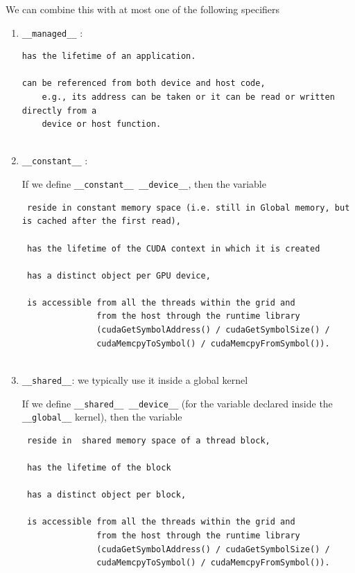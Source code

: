 We can combine this with at most one of the following specifiers
\begin{enumerate}
  
  \item \verb!__managed__! :
  
\begin{verbatim}
has the lifetime of an application.

can be referenced from both device and host code, 
    e.g., its address can be taken or it can be read or written directly from a
    device or host function.
    
\end{verbatim}
  
  \item \verb!__constant__! : 
  
  If we define \verb!__constant__ __device__!, then the variable
  \begin{verbatim}
 reside in constant memory space (i.e. still in Global memory, but is cached after the first read),
 
 has the lifetime of the CUDA context in which it is created
 
 has a distinct object per GPU device,
 
 is accessible from all the threads within the grid and 
               from the host through the runtime library 
               (cudaGetSymbolAddress() / cudaGetSymbolSize() / 
               cudaMemcpyToSymbol() / cudaMemcpyFromSymbol()).
 
  \end{verbatim}
  
  \item \verb!__shared__!: we typically use it inside a global kernel
  
   If we define \verb!__shared__ __device__! (for the variable declared inside
   the \verb!__global__! kernel), then the variable
  \begin{verbatim}
 reside in  shared memory space of a thread block,
 
 has the lifetime of the block
 
 has a distinct object per block,
 
 is accessible from all the threads within the grid and 
               from the host through the runtime library 
               (cudaGetSymbolAddress() / cudaGetSymbolSize() / 
               cudaMemcpyToSymbol() / cudaMemcpyFromSymbol()).
 
  \end{verbatim}
\end{enumerate}



